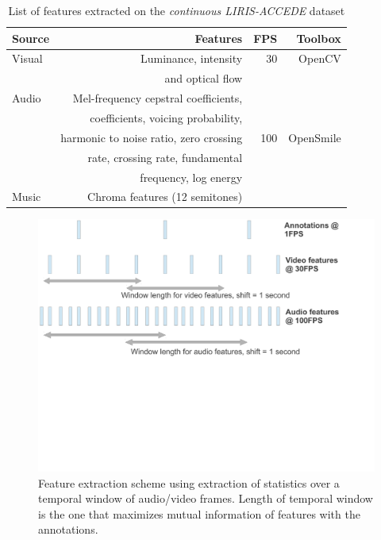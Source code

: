 \documentclass{article}
\begin{document}
\begin{table}[t]
\centering
\caption{List of features extracted on the {\it continuous LIRIS-ACCEDE} dataset}
\begin{tabular}{@{}l@{}|r|r|r@{}}\hline
{\bf Source} &{\bf Features} & {\bf FPS} & {\bf Toolbox} \\ \hline
Visual & Luminance, intensity & 30 & OpenCV \\ 
       & and optical flow & & \cite{bradski2008learning} \\ \hline
Audio & Mel-frequency cepstral coefficients,& & \\
               & coefficients, voicing probability, & & \\  
               & harmonic to noise ratio, zero crossing & 100 & OpenSmile \\  
               & rate, crossing rate, fundamental & &\cite{eyben2010opensmile} \\  
               & frequency, log energy & & \\ \cline{1-2}
Music & Chroma features (12 semitones) & & \\ 
\end{tabular}
\label{table:features}
\end{table}


\begin{figure}[t]
\centering
\includegraphics [trim=0cm 9cm 3cm 0cm,clip=true,scale=.35] {images/features_fig.pdf} 
\caption{Feature extraction scheme using extraction of statistics over a temporal window of audio/video frames. Length of temporal window is the one that maximizes mutual information of features with the annotations.}
\label{feat_fig}
\end{figure}
\end{document}
